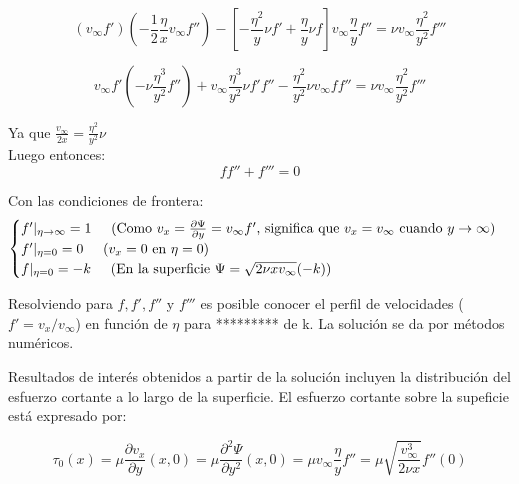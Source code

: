 \begin{equation*}
	(v_\infty f')\left( - \frac{1}{2} \frac{\eta}{x} v_\infty f''\right) - \left[- \frac{\eta^2}{y} \nu f' + \frac{\eta}{y} \nu f \right]v_\infty \frac{\eta}{y} f'' 
= \nu v_\infty \frac{\eta^2}{y^2}f'''
\end{equation*}

\begin{equation*}
	v_\infty f' \left( -\nu \frac{\eta^3}{y^2} f''\right) + v_\infty \frac{\eta^3}{y^2} \nu f' f'' - \frac{\eta^2}{y^2} \nu v_\infty ff'' = \nu v_\infty \frac{\eta^2}{y^2} f'''
\end{equation*}

Ya que $\frac{v_\infty}{2 x} = \frac{\eta^2}{y^2} \nu$ \\

Luego entonces:
\begin{equation}
	ff'' + f''' = 0
	\label{eq_3.40}
\end{equation}

Con las condiciones de frontera:
\begin{equation}
\begin{cases}
   f'|_{\eta \to \infty} = 1 \hspace{0.5cm} \text{(Como $v_x = \frac{\partial \Psi}{\partial y} = v_\infty f' $, significa que $v_x = v_\infty$ cuando $y \to \infty$)} \\
   f'|_{\eta =0} = 0 \hspace{0.5 cm} \text{($v_x = 0$ en $\eta = 0$)} \\
   f|_{\eta = 0} = -k \hspace{0.5cm} \text{(En la superficie $\Psi = \sqrt{2 \nu x v_\infty}(-k)$)}
\end{cases}
\label{eq_3.41}
\end{equation}

Resolviendo para $f, f', f''$ y $f'''$ es posible conocer el perfil de velocidades ($f' = v_x / v_\infty$) en función de $\eta$ para ********* de k. La solución se da por métodos numéricos.

Resultados de interés obtenidos a partir de la solución incluyen la distribución del esfuerzo cortante a lo largo de la superficie. El esfuerzo cortante sobre la supeficie está expresado por:

\begin{equation}
	\tau_0 (x) = \mu \frac{\partial v_x}{\partial y} (x,0) = \mu \frac{\partial^2 \Psi}{\partial y^2} (x,0) = \mu v_\infty \frac{\eta}{y} f'' = \mu \sqrt{\frac{v_\infty^3}{2 \nu x}} f'' (0)
	\label{eq_3.42}
\end{equation}

